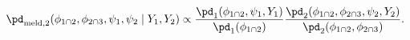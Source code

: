\begin{equation}
  \pd_{\text{meld}, 2} (\phi_{1 \cap 2}, \phi_{2 \cap 3}, \psi_{1}, \psi_{2} \mid Y_{1}, Y_{2}) \propto
  \frac {
    \pd_{1}(\phi_{1 \cap 2}, \psi_{1}, Y_{1})
  } {
    \pd_{1}(\phi_{1 \cap 2})
  }
  \frac {
    \pd_{2} (\phi_{1 \cap 2}, \phi_{2 \cap 3}, \psi_{2}, Y_{2})
  } {
    \pd_{2}(\phi_{1 \cap 2}, \phi_{2 \cap 3})
  }.
  \label{eqn:stage-two-target}
\end{equation}
